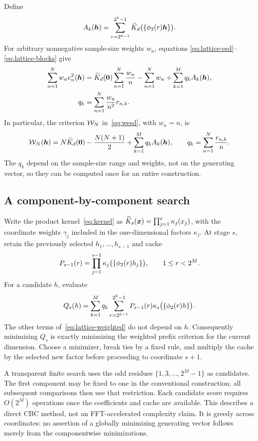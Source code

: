 Define
\begin{equation}\label{eq:lattice-blocks}
 A_k(\boldsymbol{h})=\sum_{r=2^{k-1}}^{2^k-1}
       \widetilde K_d\bigl(\{\phi_2(r)\boldsymbol{h}\}\bigr).
\end{equation}
For arbitrary nonnegative sample-size weights $w_n$, equations
\eqref{eq:lattice-esd}--\eqref{eq:lattice-blocks} give
\begin{align}\label{eq:lattice-weighted}
 \sum_{n=1}^N w_ne_n^2(\boldsymbol{h})
 &=\widetilde K_d(\boldsymbol{0})\sum_{n=1}^N\frac{w_n}{n}
   -\sum_{n=1}^Nw_n
   +\sum_{k=1}^Mq_kA_k(\boldsymbol{h}),\\
 q_k&=\sum_{n=1}^N\frac{w_n}{n^2}r_{n,k}.\notag
\end{align}
In particular, the criterion $\mathcal W_N$ in~\eqref{eq:wesd}, with $w_n=n$, is
\begin{equation}\label{eq:lattice-wesd}
 \mathcal W_N(\boldsymbol{h})=N\widetilde K_d(\boldsymbol{0})-\frac{N(N+1)}2
           +\sum_{k=1}^Mq_kA_k(\boldsymbol{h}),
 \qquad q_k=\sum_{n=1}^N\frac{r_{n,k}}n.
\end{equation}
The $q_k$ depend on the sample-size range and weights, not on the generating
vector, so they can be computed once for an entire construction.

\subsection{A component-by-component search}

Write the product kernel~\eqref{eq:kernel} as
$\widetilde K_s(\boldsymbol{x})=\prod_{j=1}^s\kappa_j(x_j)$, with the coordinate weights
$\gamma_j$ included in the one-dimensional factors $\kappa_j$.
At stage $s$, retain the previously selected $h_1,\ldots,h_{s-1}$ and cache
\[
 P_{s-1}(r)=\prod_{j=1}^{s-1}
       \kappa_j\bigl(\{\phi_2(r)h_j\}\bigr),
 \qquad 1\le r<2^M.
\]
For a candidate $h$, evaluate
\begin{equation}\label{eq:lattice-cbc-score}
 Q_s(h)=\sum_{k=1}^Mq_k
       \sum_{r=2^{k-1}}^{2^k-1}
       P_{s-1}(r)\kappa_s\bigl(\{\phi_2(r)h\}\bigr).
\end{equation}
The other terms of~\eqref{eq:lattice-weighted} do not depend on $h$.
Consequently minimizing $Q_s$ is exactly minimizing the weighted prefix
criterion for the current dimension. Choose a minimizer, break ties by a
fixed rule, and multiply the cache by the selected new factor before
proceeding to coordinate $s+1$.

A transparent finite search uses the odd residues
$\{1,3,\ldots,2^M-1\}$ as candidates. The first component may be fixed to one
in the conventional construction; all subsequent comparisons then use that
restriction. Each candidate score requires $O(2^M)$ operations once the
coefficients and cache are available. This describes a direct CBC method,
not an FFT-accelerated complexity claim. It is greedy across coordinates:
no assertion of a globally minimizing generating vector follows merely from
the componentwise minimizations.

